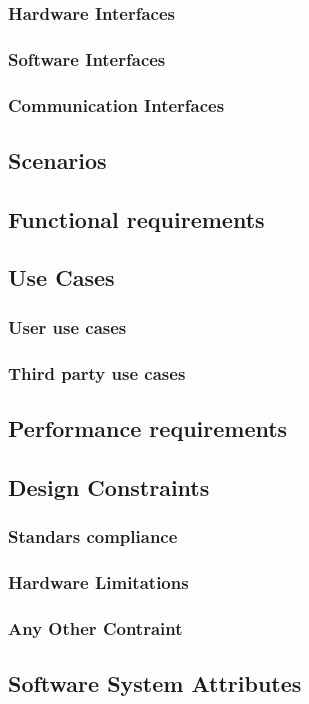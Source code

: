 \documentclass{article}
\begin{document}
\subsubsection{Hardware Interfaces}
\subsubsection{Software Interfaces}
\subsubsection{Communication Interfaces}
\subsection{Scenarios}
\subsection{Functional requirements}
\subsection{Use Cases}
\subsubsection{User use cases}
\subsubsection{Third party use cases}
\subsection{Performance requirements}
\subsection{Design Constraints}
\subsubsection{Standars compliance}
\subsubsection{Hardware Limitations}
\subsubsection{Any Other Contraint}
\subsection{Software System Attributes}
\end{document}
